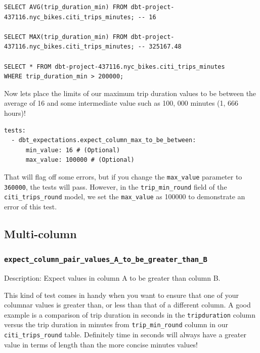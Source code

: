 \documentclass[
]{book}
\begin{document}
\begin{verbatim}
SELECT AVG(trip_duration_min) FROM dbt-project-437116.nyc_bikes.citi_trips_minutes; -- 16

SELECT MAX(trip_duration_min) FROM dbt-project-437116.nyc_bikes.citi_trips_minutes; -- 325167.48

SELECT * FROM dbt-project-437116.nyc_bikes.citi_trips_minutes
WHERE trip_duration_min > 200000;
\end{verbatim}

Now lets place the limits of our maximum trip duration values to be between the average of 16 and some intermediate value such as 100, 000 minutes (1, 666 hours)!

\begin{verbatim}
tests:
  - dbt_expectations.expect_column_max_to_be_between:
      min_value: 16 # (Optional)
      max_value: 100000 # (Optional)
\end{verbatim}

That will flag off some errors, but if you change the \texttt{max\_value} parameter to \texttt{360000}, the tests will pass. However, in the \texttt{trip\_min\_round} field of the \texttt{citi\_trips\_round} model, we set the \texttt{max\_value} as 100000 to demonstrate an error of this test.

\hypertarget{multi-column}{%
\subsection{Multi-column}\label{multi-column}}

\hypertarget{expect_column_pair_values_a_to_be_greater_than_b}{%
\subsubsection{\texorpdfstring{\texttt{expect\_column\_pair\_values\_A\_to\_be\_greater\_than\_B}}{expect\_column\_pair\_values\_A\_to\_be\_greater\_than\_B}}\label{expect_column_pair_values_a_to_be_greater_than_b}}

Description: Expect values in column A to be greater than column B.

This kind of test comes in handy when you want to ensure that one of your columnar values is greater than, or less than that of a different column. A good example is a comparison of trip duration in seconds in the \texttt{tripduration} column versus the trip duration in minutes from \texttt{trip\_min\_round} column in our \texttt{citi\_trips\_round} table. Definitely time in seconds will always have a greater value in terms of length than the more concise minutes values!
\end{document}
